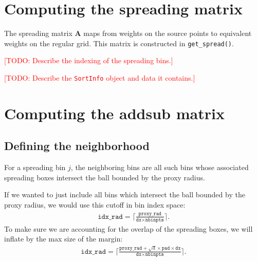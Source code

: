 \documentclass[11pt]{article}
\newcommand{\todo}[1]{{\textcolor{red}{[TODO: #1]}}}
\begin{document}
\section{Computing the spreading matrix}
The spreading matrix $\boldsymbol{A}$ maps from weights on the source points to equivalent weights on the regular grid. This matrix is constructed in \texttt{get\_spread()}.

\todo{Describe the indexing of the spreading bins.}

\todo{Describe the \texttt{SortInfo} object and data it contains.}

\section{Computing the addsub matrix}



\subsection{Defining the neighborhood}

For a spreading bin $j$, the neighboring bins are all such bins whose associated spreading boxes intersect the ball bounded by the proxy radius.

If we wanted to just include all bins which intersect the ball bounded by the proxy radius, we would use this cutoff in bin index space:
\begin{align*}
  \texttt{idx\_rad} = \lceil \frac{\texttt{proxy\_rad}}{\texttt{dx} \times \texttt{nbinpts}} \rceil.
\end{align*}
To make sure we are accounting for the overlap of the spreading boxes, we will inflate by the max size of the margin:
\begin{align*}
  \texttt{idx\_rad} = \lceil \frac{\texttt{proxy\_rad} + \sqrt{d} \times \texttt{pad} \times \texttt{dx}}{\texttt{dx} \times \texttt{nbinpts}} \rceil.
\end{align*}
\end{document}
